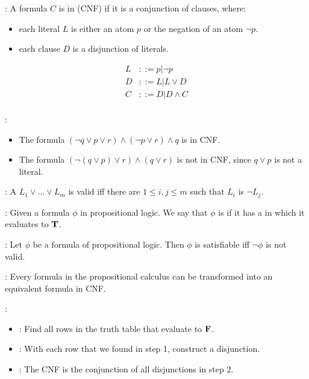     : A formula $C$ is in  (CNF) if it is a conjunction of clauses, where:
      \begin{itemize}
        \item each literal $L$ is either an atom $p$ or the negation of an atom $\lnot p$.
        \item each clause $D$ is a disjunction of literals.
      \end{itemize}
      \begin{align*}
        L &::= p | \lnot p \\
        D &::= L | L \lor D \\
        C &::= D | D \land C \\
      \end{align*}

      :
      \begin{itemize}
        \item The formula $(\lnot q \lor p \lor r) \land (\lnot p \lor r) \land q$ is in CNF.
        \item The formula $(\lnot (q \lor p) \lor r) \land (q \lor r)$ is not in CNF, since $q \lor p$ is not a literal.
      \end{itemize}

    : A  $L_1 \lor \ldots \lor L_m$ is valid iff there are $1 \leq i, j \leq m$ such that $L_i$ is $\lnot L_j$.

    : Given a formula $\phi$ in propositional logic. We say that $\phi$ is  if it has a  in which it evaluates to $\mathbf{T}$.

    : Let $\phi$ be a formula of propositional logic. Then $\phi$ is satisfiable iff $\lnot \phi$ is not valid.

    : Every formula in the propositional calculus can be transformed into an equivalent formula in CNF.

    :
      \begin{itemize}
        \item {}: Find all rows in the truth table that evaluate to $\mathbf{F}$.
        \item {}: With each row that we found in step 1, construct a disjunction.
        \item {}: The CNF is the conjunction of all disjunctions in step 2.
      \end{itemize}

